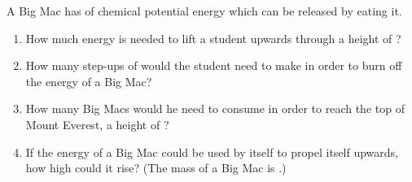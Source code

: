 
\begin{problem}[Robin10]
{A Big Mac has  of chemical potential energy which can be released by eating it. 
\begin{enumerate}
	\item How much energy is needed to lift a  student upwards through a height of ?
	\item How many step-ups of  would the student need to make in order to burn off the energy of a Big Mac?
	\item How many Big Macs would he need to consume in order to reach the top of Mount Everest, a height of ?
	\item If the energy of a Big Mac could be used by itself to propel itself upwards, how high could it rise? (The mass of a Big Mac is .)
\end{enumerate}
}
{}
{}
\end{problem}